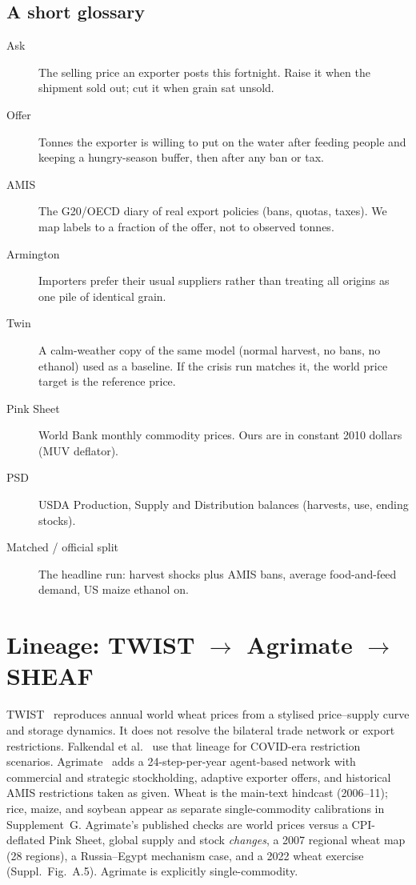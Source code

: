 \documentclass[11pt,a4paper]{article}
\begin{document}
\subsection{A short glossary}

\begin{description}
\item[Ask] The selling price an exporter posts this fortnight. Raise it
      when the shipment sold out; cut it when grain sat unsold.
\item[Offer] Tonnes the exporter is willing to put on the water after
      feeding people and keeping a hungry-season buffer, then after any
      ban or tax.
\item[AMIS] The G20/OECD diary of real export policies (bans, quotas,
      taxes). We map labels to a fraction of the offer, not to observed
      tonnes.
\item[Armington] Importers prefer their usual suppliers rather than
      treating all origins as one pile of identical grain.
\item[Twin] A calm-weather copy of the same model (normal harvest, no
      bans, no ethanol) used as a baseline. If the crisis run matches it,
      the world price target is the reference price.
\item[Pink Sheet] World Bank monthly commodity prices. Ours are in
      constant 2010 dollars (MUV deflator).
\item[PSD] USDA Production, Supply and Distribution balances
      (harvests, use, ending stocks).
\item[Matched / official split] The headline run: harvest shocks plus
      AMIS bans, average food-and-feed demand, US maize ethanol on.
\end{description}

\section{Lineage: TWIST $\to$ Agrimate $\to$ SHEAF}
\label{sec:lineage}

TWIST~\citep{schewe2017} reproduces annual world wheat prices from a
stylised price--supply curve and storage dynamics. It does not resolve the
bilateral trade network or export restrictions. Falkendal et al.\
\citep{falkendal2021} use that lineage for COVID-era restriction scenarios.
Agrimate~\citep{kuhla2025} adds a 24-step-per-year agent-based network with
commercial and strategic stockholding, adaptive exporter offers, and
historical AMIS restrictions taken as given. Wheat is the main-text
hindcast (2006--11); rice, maize, and soybean appear as separate
single-commodity calibrations in Supplement~G. Agrimate's published checks
are world prices versus a CPI-deflated Pink Sheet, global supply and stock
\emph{changes}, a 2007 regional wheat map (28 regions), a Russia--Egypt
mechanism case, and a 2022 wheat exercise (Suppl.\ Fig.~A.5). Agrimate is
explicitly single-commodity.
\end{document}
